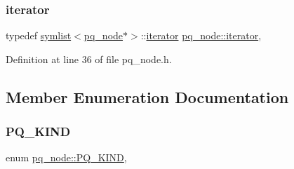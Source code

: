 \subsubsection{\texorpdfstring{iterator}{iterator}}
{\footnotesize\ttfamily typedef \mbox{\hyperlink{classsymlist}{symlist}}$<$\mbox{\hyperlink{classpq__node}{pq\+\_\+node}}$\ast$$>$\+::\mbox{\hyperlink{classpq__node_a34898c9eb1527787c07e8ebefd6bfba5}{iterator}} \mbox{\hyperlink{classpq__node_a34898c9eb1527787c07e8ebefd6bfba5}{pq\+\_\+node\+::iterator}}\hspace{0.3cm}{\ttfamily [protected]}, {\ttfamily [inherited]}}



Definition at line 36 of file pq\+\_\+node.\+h.



\subsection{Member Enumeration Documentation}
\mbox{\label{classpq__node_a96827bdca8bf81d20213405dd27f8fa6}} 
\subsubsection{\texorpdfstring{P\+Q\+\_\+\+K\+I\+ND}{PQ\_KIND}}
{\footnotesize\ttfamily enum \mbox{\hyperlink{classpq__node_a96827bdca8bf81d20213405dd27f8fa6}{pq\+\_\+node\+::\+P\+Q\+\_\+\+K\+I\+ND}}\hspace{0.3cm}{\ttfamily [protected]}, {\ttfamily [inherited]}}

